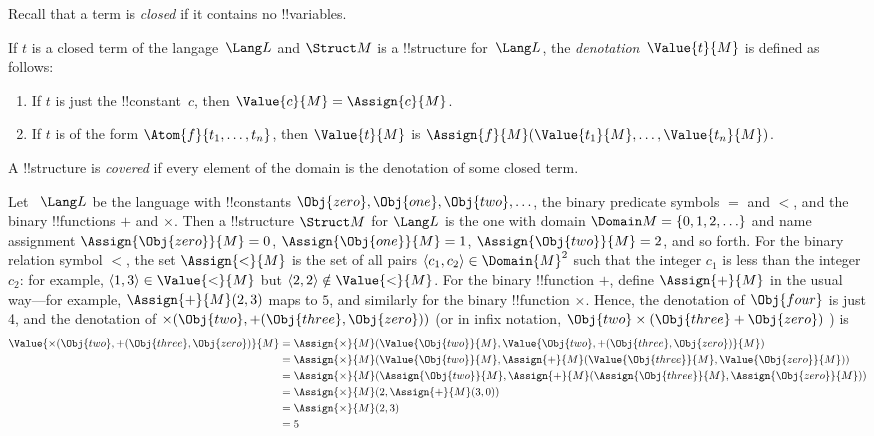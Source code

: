 \documentclass[../../include/open-logic-section]{subfiles}
\begin{document}
\begin{explain}
Recall that a term is \emph{closed} if it contains no !!{variable}s.
\end{explain}

\begin{defn}
If $t$ is a closed term of the langage~$\Lang L$ and $\Struct M$ is a
!!{structure} for~$\Lang L$, the \emph{denotation}~$\Value{t}{M}$ is
defined as follows:
\begin{enumerate}
\item If $t$ is just the !!{constant}~$c$, then $\Value{c}{M} = \Assign{c}{M}$.
\item If $t$ is of the form $\Atom{f}{t_1, \ldots, t_n}$, then
  $\Value{t}{M}$ is $\Assign{f}{M}(\Value{t_1}{M}, \ldots,
  \Value{t_n}{M})$.
\end{enumerate}
\end{defn}

\begin{defn}
A !!{structure} is \emph{covered} if every element of the domain is the
denotation of some closed term.
\end{defn}

\begin{ex}
Let ~$\Lang L$ be the language with !!{constant}s $\Obj{zero},
\Obj{one}, \Obj{two}, \ldots$, the binary predicate symbols $=$
and $<$, and the binary !!{function}s $+$ and $\times$.  Then a
!!{structure} $\Struct M$ for $\Lang L$ is the one with domain
$\Domain M = \{0, 1, 2, \ldots \}$ and name assignment
$\Assign{\Obj{zero}}{M} = 0$, $\Assign{\Obj{one}}{M} = 1$,
$\Assign{\Obj{two}}{M} = 2$, and so forth. For the binary relation
symbol $<$, the set $\Assign{<}{M}$ is the set of all pairs $\langle
c_1, c_2 \rangle \in \Domain{M}^2$ such that the integer $c_1$ is less
than the integer $c_2$: for example, $\langle 1, 3 \rangle \in
\Value{<}{M}$ but $\langle 2, 2 \rangle \notin \Value{<}{M}$. For the
binary !!{function} $+$, define $\Assign{+}{M}$ in the usual way---for
example, $\Assign{+}{M}(2,3)$ maps to $5$, and similarly for the
binary !!{function} $\times$. Hence, the denotation of $\Obj{four}$
is just 4, and the denotation of $\times(\Obj{two},
+(\Obj{three},\Obj{zero}))$ (or in infix notation, $\Obj{two}
\times (\Obj{three} + \Obj{zero})$ ) is
\begin{align*} 
\Value{\times(\Obj{two}, +(\Obj{three},\Obj{zero})}{M}&=
\Assign{\times}{M}(\Value{\Obj{two}}{M}, \Value{\Obj{two}, 
+(\Obj{three}, \Obj{zero})}{M})\\
&= \Assign{\times}{M}(\Value{\Obj{two}}{M}, \Assign{+}{M}(\Value{\Obj{three}}{M}, 
\Value{\Obj{zero}}{M})) \\
&= \Assign{\times}{M}(\Assign{\Obj{two}}{M}, \Assign{+}{M}(\Assign{\Obj{three}}{M}, 
\Assign{\Obj{zero}}{M})) \\
&= \Assign{\times}{M}(2, \Assign{+}{M}(3, 0)) \\
&= \Assign{\times}{M}(2, 3) \\
&= 5
\end{align*}
\end{ex}
\end{document}
